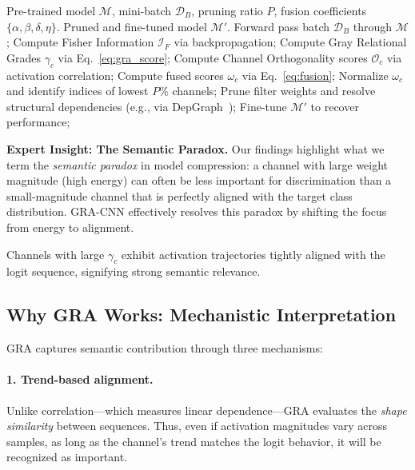 \documentclass[sn-mathphys,Numbered]{sn-jnl}
\begin{document}
\begin{algorithm}[H]
\caption{GRA-CNN Structured Channel Pruning (Full Framework)}
\label{alg:gra_pruning}
\begin{algorithmic}[1]
\Require Pre-trained model $\mathcal{M}$, mini-batch $\mathcal{D}_B$, pruning ratio $P$, fusion coefficients $\{\alpha, \beta, \delta, \eta\}$.
\Ensure Pruned and fine-tuned model $\mathcal{M}'$.
\State Forward pass batch $\mathcal{D}_B$ through $\mathcal{M}$;
\State Compute Fisher Information $\mathcal{I}_F$ via backpropagation;
\State Compute Gray Relational Grades $\gamma_c$ via Eq.~\eqref{eq:gra_score};
\State Compute Channel Orthogonality scores $\mathcal{O}_c$ via activation correlation;
    \State Compute fused scores $\omega_c$ via Eq.~\eqref{eq:fusion};
    \State Normalize $\omega_c$ and identify indices of lowest $P\%$ channels;
    \State Prune filter weights and resolve structural dependencies (e.g., via DepGraph~\cite{fang2023depgraph});
\EndFor
\State Fine-tune $\mathcal{M}'$ to recover performance;
\end{algorithmic}
\end{algorithm}

\noindent\textbf{Expert Insight: The Semantic Paradox.}  
Our findings highlight what we term the \emph{semantic paradox} in model compression: a channel with large weight magnitude (high energy) can often be less important for discrimination than a small-magnitude channel that is perfectly aligned with the target class distribution. GRA-CNN effectively resolves this paradox by shifting the focus from energy to alignment.

Channels with large $\gamma_{c}$ exhibit activation trajectories tightly aligned with the logit sequence, signifying strong semantic relevance.

\subsection{Why GRA Works: Mechanistic Interpretation}

GRA captures semantic contribution through three mechanisms:

\paragraph{1. Trend-based alignment.}  
Unlike correlation—which measures linear dependence—GRA evaluates the \emph{shape similarity} between sequences. Thus, even if activation magnitudes vary across samples, as long as the channel’s trend matches the logit behavior, it will be recognized as important.
\end{document}
